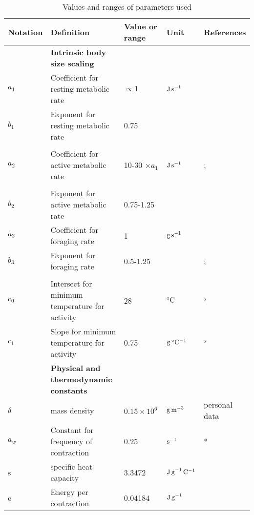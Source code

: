 
\begin{sidewaystable}
\caption{Values and ranges of parameters used }
\begin{tabular}{l l l l l}
\hline
Notation& Definition & Value or range & Unit & References \\
\hline
&\textbf{Intrinsic body size scaling} & & &  \\
$a_1$ & Coefficient for resting metabolic rate  & $\propto 1$  & $\rm{J \, s}^{-1}$ & \citet{Heinrich1975} \\
$b_1$ & Exponent for resting metabolic rate  & 0.75 &  & \citet{Kleiber1947,Peters1986} \\
      &                                      &      &  & \citet{Gillooly2001} \\
$a_2$ & Coefficient for active metabolic rate  & 10-30 $ \times a_1$ & $\rm{J \, s}^{-1}$ &  \citet{Bartholomew1981}; \\
      &                                        &                     &                    &  \citet{Niitepold2010} \\
$b_2$ & Exponent for active metabolic rate  & 0.75-1.25 & &  \citet{Heinrich1975} \\
$a_3$ & Coefficient for foraging rate  & 1 & $\rm{g \, s}^{-1}$  & \\
$b_3$ & Exponent  for foraging rate  & 0.5-1.25 &  &  \citet{Pawar2012, Nervo2014}; \\
      &                              &          &  &  \citet{Maino2015} \\
$c_0$ & Intersect for minimum temperature for activity & 28 & $^{\circ}\rm{C}$  & \citep{Bartholomew1977a}* \\
$c_1$ & Slope for minimum temperature for activity & 0.75 &  $\rm{g \,  ^{\circ}C^{-1}}$ &  \citep{Bartholomew1977a}* \\
\hline
& \textbf{Physical and thermodynamic constants} & & &  \\
$\delta $ & mass density & $0.15 \times 10^6$  & $\rm{g \, m}^{-3}$  & personal data\\
$a_w$& Constant for frequency of contraction & 0.25 & $\rm{s}^{-1}$   & \citet{Bartholomew1977b}*\\
s & specific heat capacity & 3.3472 & $\rm{J \, g}^{-1}\,\rm{C}^{-1}$ & \citet{Heinrich1975} \\
e & Energy per contraction & 0.04184 & $\rm{J \, g}^{-1}$ &\citet{Kammer1974} \\

\end{tabular}
\end{sidewaystable}
